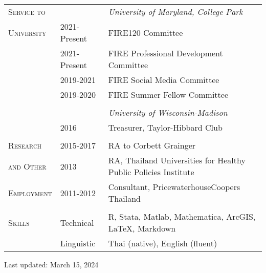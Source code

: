 \documentclass[letterpaper,11pt,oneside]{article}\usepackage[]{graphicx}\usepackage[]{xcolor}
\begin{document}
\noindent \begin{tabular}{p{1.2in} p{0.9in} l}                         
\textsc{Service to}		&               & \textit{University of Maryland, College Park} \\
\textsc{University}	  & 2021-Present  & FIRE120 Committee \\
                      & 2021-Present	& FIRE Professional Development Committee \\
                      & 2019-2021 	  & FIRE Social Media Committee \\
                      & 2019-2020 	  & FIRE Summer Fellow Committee \\
                      & & \\  
                      &               & \textit{University of Wisconsin-Madison} \\
                		  & 2016			    & Treasurer, Taylor-Hibbard Club\\
				              & 				      & \\
                        
\textsc{Research}		& 2015-2017	        & RA to Corbett Grainger\\
\textsc{and Other}	& 2013 				      & RA, Thailand Universities for Healthy Public Policies Institute\\
\textsc{Employment}	& 2011-2012 		    & Consultant, PricewaterhouseCoopers Thailand\\
                    & 				          & \\
\textsc{Skills}	& Technical   & R, Stata, Matlab, Mathematica, ArcGIS, \LaTeX, Markdown \\
        		    & Linguistic & Thai (native), English (fluent) \\
\end{tabular}

\begin{center} Last updated: March 15, 2024 \end{center}
					
\end{document}
